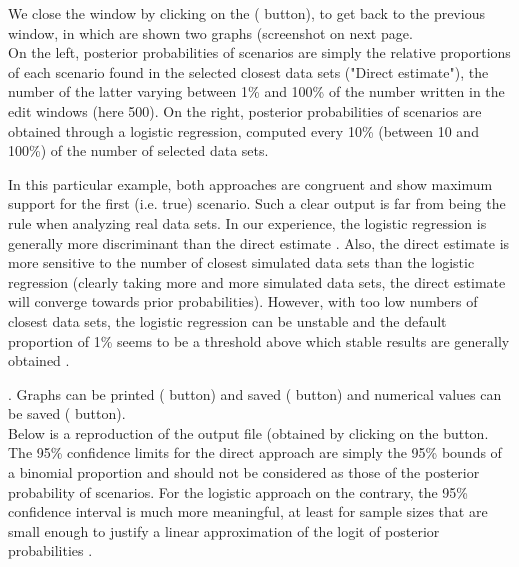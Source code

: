 
We close the window by clicking on the  ( button), to get back to the previous window, in which are shown two graphs (screenshot on next page.\\
On the left, posterior probabilities of scenarios are simply the relative proportions of each scenario found in the selected closest data sets ("Direct estimate"), the number of the latter varying between 1\% and 100\%  of the number written in the edit windows (here 500). On the right, posterior probabilities of scenarios are obtained through a logistic regression, computed every 10\% (between 10 and 100\%) of the number of selected data sets.\\

\newpage


 In this particular example, both approaches are congruent and show maximum support for the first (i.e. true) scenario. Such a clear output is far from being the rule when analyzing real data sets. In our experience, the logistic regression is generally more discriminant than the direct estimate \citep{C2008}. Also, the direct estimate is more sensitive to the number of closest simulated data sets than the logistic regression (clearly taking more and more simulated data sets, the direct estimate will converge towards  prior probabilities). However, with too low numbers of closest data sets, the logistic regression can be unstable and the default proportion of 1\% seems to be a threshold above which stable results are generally obtained \citep[see e.g.][]{G2010,L2010}.


 . Graphs can be printed ( button) and saved ( button) and numerical values can be saved ( button).\\
Below is a reproduction of the output file (obtained by clicking on the  button. The 95\% confidence limits for the direct approach are simply the 95\% bounds of a binomial proportion and should not be considered as those of the posterior probability of scenarios.  For the logistic approach on the contrary, the 95\% confidence interval is much more meaningful, at least for sample sizes that are small enough to justify a linear approximation of the logit of posterior probabilities \citep[see][]{C2008}.

